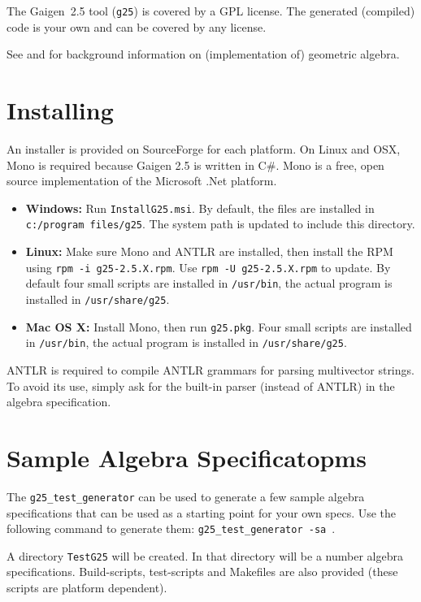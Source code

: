 \documentclass[10pt, a4paper]{article}
\begin{document}
The Gaigen~2.5 tool ({\tt g25}) is covered by a GPL license. 
The generated (compiled) code is your own and can be covered by any license.

See \cite{GA4CS} and \cite{fontijnePhD} for background information on (implementation of) geometric algebra.


\section{Installing}

An installer is provided on SourceForge for each platform.
On Linux and OSX, Mono is required because Gaigen 2.5 is written in C\#.
Mono is a free, open source implementation of the Microsoft .Net platform.

\begin{itemize}
\item {\bf Windows: } Run {\tt InstallG25.msi}. By default, the files are installed in {\tt c:/program files/g25}.
The system path is updated to include this directory.
\item {\bf Linux: } Make sure Mono and ANTLR are installed, then install the RPM using 
{\tt rpm -i g25-2.5.X.rpm}. Use {\tt rpm -U g25-2.5.X.rpm} to update.
By default four small scripts are installed in {\tt /usr/bin}, the actual program is installed in {\tt /usr/share/g25}.
\item {\bf Mac OS X:} Install Mono, then run {\tt g25.pkg}. Four small scripts are installed in {\tt /usr/bin}, the actual 
program is installed in {\tt /usr/share/g25}.
\end{itemize}

ANTLR is required to compile ANTLR grammars for parsing multivector strings.
To avoid its use, simply ask for the built-in parser (instead of ANTLR) in the algebra specification.

\section{Sample Algebra Specificatopms}
\label{s:sample_algebras}

The {\tt g25\_test\_generator} can be used to generate a few sample algebra specifications
that can be used as a starting point for your own specs. Use the following command
to generate them: {\tt g25\_test\_generator -sa }.

A directory {\tt TestG25} will be created. In that directory will be a number algebra specifications.
Build-scripts, test-scripts and Makefiles are also provided (these scripts are platform dependent).
\end{document}
